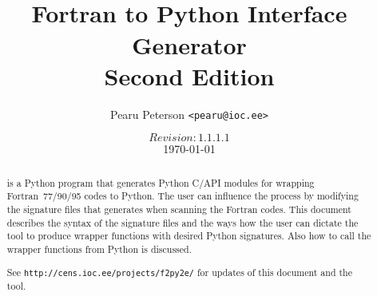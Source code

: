 \documentclass{article}
\title{\fpy\\Fortran to Python Interface Generator\\{\large Second Edition}}
\author{Pearu Peterson \texttt{<pearu@ioc.ee>}}
\date{$Revision: 1.1.1.1 $\\\today}
\begin{document}

\maketitle
\begin{abstract}
  \fpy is a Python program that generates Python C/API modules for
  wrapping Fortran~77/90/95 codes to Python. The user can influence the
  process by modifying the signature files that \fpy generates when
  scanning the Fortran codes. This document describes the syntax of
  the signature files and the ways how the user can dictate the tool
  to produce wrapper functions with desired Python signatures. Also
  how to call the wrapper functions from Python is discussed.

  See \texttt{http://cens.ioc.ee/projects/f2py2e/} for updates of this
  document and the tool. 
\end{abstract}

\tableofcontents







\appendix


\end{document}
